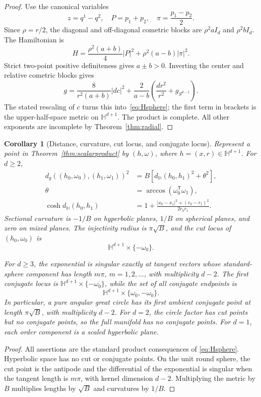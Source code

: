 \documentclass[11pt]{article}
\newtheorem{corollary}{Corollary}
\begin{document}
\begin{proof}
Use the canonical variables
\[
 z=q^1-q^2,\quad P=p_1+p_2,\quad
 \pi=\frac{p_1-p_2}{2}.
\]
Since \(\rho=r/2\), the diagonal and off-diagonal cometric blocks are
\(\rho^2aI_d\) and \(\rho^2bI_d\).  The Hamiltonian is
\[
 H=\frac{\rho^2(a+b)}4|P|^2
   +\rho^2(a-b)|\pi|^2.
\]
Strict two-point positive definiteness gives \(a\pm b>0\).  Inverting the
center and relative cometric blocks gives
\[
 g=\frac{8}{r^2(a+b)}|dc|^2
  +\frac{2}{a-b}
   \left(\frac{dr^2}{r^2}+g_{S^{d-1}}\right).
\]
The stated rescaling of \(c\) turns this into~\eqref{eq:Hsphere}; the
first term in brackets is the upper-half-space metric on
\(\mathbb H^{d+1}\).  The product is complete.  All other exponents are
incomplete by Theorem~\ref{thm:radial}.
\end{proof}

\begin{corollary}[Distance, curvature, cut locus, and conjugate locus]
\label{cor:fullgeometry}
Represent a point in Theorem~\ref{thm:scalarproduct} by
\((h,\omega)\), where \(h=(x,r)\in\mathbb H^{d+1}\).  For \(d\ge2\),
\[
\begin{aligned}
 d_g((h_0,\omega_0),(h_1,\omega_1))^2
 &=B\left[d_{\mathbb H}(h_0,h_1)^2+\theta^2\right],\\
 \theta&=\arccos(\omega_0^{\mathsf T}\omega_1),\\
 \cosh d_{\mathbb H}(h_0,h_1)
 &=1+\frac{|x_0-x_1|^2+(r_0-r_1)^2}{2r_0r_1}.
\end{aligned}
\]
Sectional curvature is \(-1/B\) on hyperbolic planes, \(1/B\) on
spherical planes, and zero on mixed planes.  The injectivity radius is
\(\pi\sqrt B\), and the cut locus of \((h_0,\omega_0)\) is
\[
 \mathbb H^{d+1}\times\{-\omega_0\}.
\]

For \(d\ge3\), the exponential is singular exactly at tangent vectors whose
standard-sphere component has length \(m\pi\), \(m=1,2,\ldots\), with
multiplicity \(d-2\).  The first conjugate locus is
\(\mathbb H^{d+1}\times\{-\omega_0\}\), while the set of all conjugate
endpoints is
\[
 \mathbb H^{d+1}\times\{\omega_0,-\omega_0\}.
\]
In particular, a pure angular great circle has its first \emph{ambient}
conjugate point at length \(\pi\sqrt B\), with multiplicity \(d-2\).
For \(d=2\), the circle factor has cut points but no conjugate points, so the
full manifold has no conjugate points.  For \(d=1\), each order component is
a scaled hyperbolic plane.
\end{corollary}

\begin{proof}
All assertions are the standard product consequences of
\eqref{eq:Hsphere}.  Hyperbolic space has no cut or conjugate points.  On
the unit round sphere, the cut point is the antipode and the differential of
the exponential is singular when the tangent length is \(m\pi\), with kernel
dimension \(d-2\).  Multiplying the metric by \(B\) multiplies lengths by
\(\sqrt B\) and curvatures by \(1/B\).
\end{proof}
\end{document}
